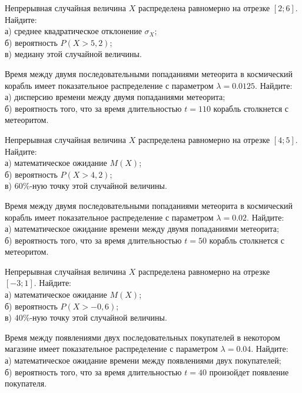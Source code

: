 \vfill

\newpage\setcounter{zad}{0}

\z Непрерывная случайная величина $X$ распределена равномерно на отрезке $[2; 6]$. Найдите: \\ \quad а) среднее квадратическое отклонение $\sigma_X$; \\ \quad б) вероятность $P(X>5{,}2)$; \\ \quad в) медиану этой случайной величины.


\vfill

\z Время между двумя последовательными попаданиями метеорита в космический корабль имеет показательное распределение с параметром $\lambda = 0.0125$. Найдите: \\ \quad а) дисперсию времени между двумя попаданиями метеорита; \\ \quad б) вероятность того, что за время длительностью $t = 110$ корабль  столкнется с метеоритом.
 

\vfill

\newpage\setcounter{zad}{0}

\z Непрерывная случайная величина $X$ распределена равномерно на отрезке $[4; 5]$. Найдите: \\ \quad а) математическое ожидание $M(X)$; \\ \quad б) вероятность $P(X>4{,}2)$; \\ \quad в) $60\%$-ную точку этой случайной величины.


\vfill

\z Время между двумя последовательными попаданиями метеорита в космический корабль имеет показательное распределение с параметром $\lambda = 0.02$. Найдите: \\ \quad а) математическое ожидание времени между двумя попаданиями метеорита; \\ \quad б) вероятность того, что за время длительностью $t = 50$ корабль  столкнется с метеоритом.
 

\vfill

\newpage\setcounter{zad}{0}

\z Непрерывная случайная величина $X$ распределена равномерно на отрезке $[-3; 1]$. Найдите: \\ \quad а) математическое ожидание $M(X)$; \\ \quad б) вероятность $P(X>-0{,}6)$; \\ \quad в) $40\%$-ную точку этой случайной величины.


\vfill

\z Время между появлениями двух последовательных покупателей в некотором магазине имеет показательное распределение с параметром $\lambda = 0.04$. Найдите: \\ \quad а) математическое ожидание времени между появлениями двух покупателей; \\ \quad б) вероятность того, что за время длительностью $t = 40$  произойдет появление покупателя.
 

